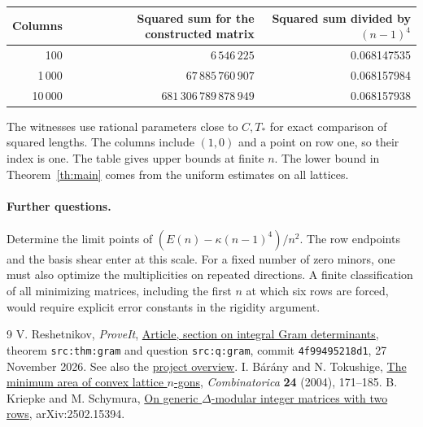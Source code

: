 \documentclass[11pt]{article}
\newcommand{\tp}{T_{\!*}}\newcommand{\rank}{\operatorname{rank}}
\newcommand{\sourcebase}{https://github.com/VladimirReshetnikov/ProveIt/blob/4f99495218d1a19087deabd8fb5bbb8f5df72a46/Analysis/GeneralizedRiemannHypothesis}
\begin{document}
\begin{center}
\begin{tabular}{rrr}\toprule
Columns & Squared sum for the constructed matrix & Squared sum divided by $(n-1)^4$\\\midrule
100 & $6\,546\,225$ & 0.068147535\\
1\,000 & $67\,885\,760\,907$ & 0.068157984\\
10\,000 & $681\,306\,789\,878\,949$ & 0.068157938\\\bottomrule
\end{tabular}
\end{center}
The witnesses use rational parameters close to $C,\tp$ for exact comparison of squared lengths. The columns include $(1,0)$ and a point on row one, so their index is one. The table gives upper bounds at finite $n$. The lower bound in Theorem~\ref{th:main} comes from the uniform estimates on all lattices.

\paragraph{Further questions.}
Determine the limit points of $(E(n)-\kappa(n-1)^4)/n^2$. The row endpoints and the basis shear enter at this scale. For a fixed number of zero minors, one must also optimize the multiplicities on repeated directions. A finite classification of all minimizing matrices, including the first $n$ at which six rows are forced, would require explicit error constants in the rigidity argument.

\begin{thebibliography}{9}
 V. Reshetnikov, \emph{ProveIt}, \href{\sourcebase/Article/sections/src.tex}{Article, section on integral Gram determinants}, theorem \texttt{src:thm:gram} and question \texttt{src:q:gram}, commit \texttt{4f99495218d1}, 27 November 2026. See also the \href{\sourcebase/README.md}{project overview}.
 I. B\'ar\'any and N. Tokushige, \href{https://www.renyi.hu/~barany/cikkek/94.pdf}{The minimum area of convex lattice $n$-gons}, \emph{Combinatorica} \textbf{24} (2004), 171--185.
 B. Kriepke and M. Schymura, \href{https://arxiv.org/abs/2502.15394}{On generic $\Delta$-modular integer matrices with two rows}, arXiv:2502.15394.
\end{thebibliography}
\end{document}
